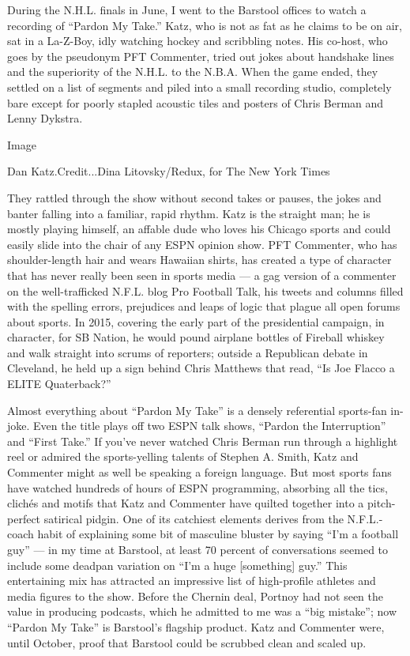During the N.H.L. finals in June, I went to the Barstool offices to
watch a recording of ``Pardon My Take.'' Katz, who is not as fat as he
claims to be on air, sat in a La-Z-Boy, idly watching hockey and
scribbling notes. His co-host, who goes by the pseudonym PFT Commenter,
tried out jokes about handshake lines and the superiority of the N.H.L.
to the N.B.A. When the game ended, they settled on a list of segments
and piled into a small recording studio, completely bare except for
poorly stapled acoustic tiles and posters of Chris Berman and Lenny
Dykstra.

Image

Dan Katz.Credit...Dina Litovsky/Redux, for The New York Times

They rattled through the show without second takes or pauses, the jokes
and banter falling into a familiar, rapid rhythm. Katz is the straight
man; he is mostly playing himself, an affable dude who loves his Chicago
sports and could easily slide into the chair of any ESPN opinion show.
PFT Commenter, who has shoulder-length hair and wears Hawaiian shirts,
has created a type of character that has never really been seen in
sports media --- a gag version of a commenter on the well-trafficked
N.F.L. blog Pro Football Talk, his tweets and columns filled with the
spelling errors, prejudices and leaps of logic that plague all open
forums about sports. In 2015, covering the early part of the
presidential campaign, in character, for SB Nation, he would pound
airplane bottles of Fireball whiskey and walk straight into scrums of
reporters; outside a Republican debate in Cleveland, he held up a sign
behind Chris Matthews that read, ``Is Joe Flacco a ELITE Quaterback?''

Almost everything about ``Pardon My Take'' is a densely referential
sports-fan in-joke. Even the title plays off two ESPN talk shows,
``Pardon the Interruption'' and ``First Take.'' If you've never watched
Chris Berman run through a highlight reel or admired the sports-yelling
talents of Stephen A. Smith, Katz and Commenter might as well be
speaking a foreign language. But most sports fans have watched hundreds
of hours of ESPN programming, absorbing all the tics, clichés and motifs
that Katz and Commenter have quilted together into a pitch-perfect
satirical pidgin. One of its catchiest elements derives from the
N.F.L.-coach habit of explaining some bit of masculine bluster by saying
``I'm a football guy'' --- in my time at Barstool, at least 70 percent
of conversations seemed to include some deadpan variation on ``I'm a
huge {[}something{]} guy.'' This entertaining mix has attracted an
impressive list of high-profile athletes and media figures to the show.
Before the Chernin deal, Portnoy had not seen the value in producing
podcasts, which he admitted to me was a ``big mistake''; now ``Pardon My
Take'' is Barstool's flagship product. Katz and Commenter were, until
October, proof that Barstool could be scrubbed clean and scaled up.

